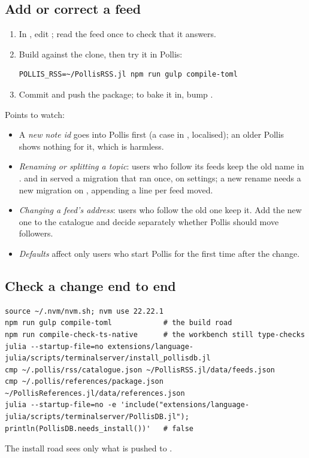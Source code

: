 \subsection{Add or correct a feed}\label{sec:proc-rss}
\begin{enumerate}
  \item In , edit ; read the feed once to check that it answers.
  \item Build against the clone, then try it in Pollis:
\begin{lstlisting}
POLLIS_RSS=~/PollisRSS.jl npm run gulp compile-toml
\end{lstlisting}
  \item Commit and push the package; to bake it in, bump .
\end{enumerate}
Points to watch:
\begin{itemize}
  \item A \emph{new note id} goes into Pollis first (a case in , localised); an older Pollis shows
    nothing for it, which is harmless.
  \item \emph{Renaming or splitting a topic}: users who follow its feeds keep the old name in .
     and  in  served a migration that ran once, on
    settings; a new rename needs a new migration on , appending a line per feed moved.
  \item \emph{Changing a feed's address}: users who follow the old one keep it. Add the new one to the catalogue and
    decide separately whether Pollis should move followers.
  \item \emph{Defaults} affect only users who start Pollis for the first time after the change.
\end{itemize}

\subsection{Check a change end to end}
\begin{lstlisting}
source ~/.nvm/nvm.sh; nvm use 22.22.1
npm run gulp compile-toml            # the build road
npm run compile-check-ts-native      # the workbench still type-checks
julia --startup-file=no extensions/language-julia/scripts/terminalserver/install_pollisdb.jl
cmp ~/.pollis/rss/catalogue.json ~/PollisRSS.jl/data/feeds.json
cmp ~/.pollis/references/package.json ~/PollisReferences.jl/data/references.json
julia --startup-file=no -e 'include("extensions/language-julia/scripts/terminalserver/PollisDB.jl"); println(PollisDB.needs_install())'   # false
\end{lstlisting}
The install road sees only what is pushed to .


